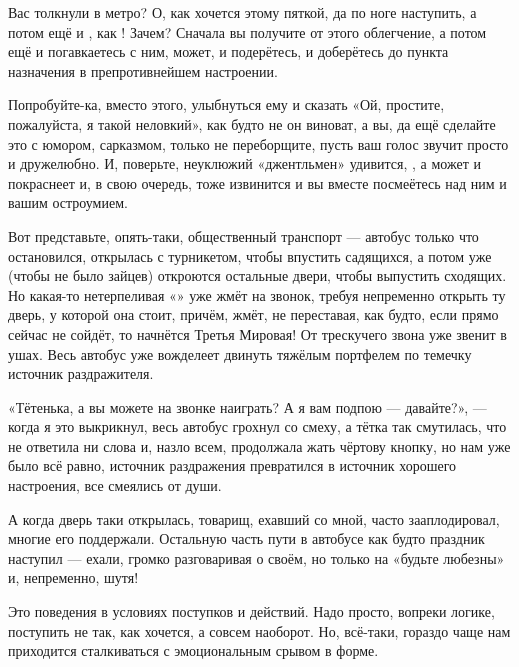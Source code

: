 Вас толкнули в метро? О, как хочется этому  пяткой, да по ноге наступить, а потом ещё и , как ! Зачем? Сначала вы получите от этого облегчение, а потом ещё и погавкаетесь с ним, может, и подерётесь, и доберётесь до пункта назначения в препротивнейшем настроении.

Попробуйте-ка, вместо этого, улыбнуться ему и сказать «Ой, простите, пожалуйста, я такой неловкий», как будто не он виноват, а вы, да ещё сделайте это с юмором,  сарказмом, только не переборщите, пусть ваш голос звучит просто и дружелюбно. И, поверьте, неуклюжий «джентльмен» удивится, , а может и покраснеет и, в свою очередь, тоже извинится и вы вместе посмеётесь над ним и вашим остроумием.

Вот представьте, опять-таки, общественный транспорт — автобус только что остановился, открылась  с турникетом, чтобы впустить садящихся, а потом уже (чтобы не было зайцев) откроются остальные двери, чтобы выпустить сходящих. Но какая-то нетерпеливая «» уже жмёт на звонок, требуя непременно открыть ту дверь, у которой она стоит, причём, жмёт, не переставая, как будто, если прямо сейчас не сойдёт, то начнётся Третья Мировая! От трескучего звона уже звенит в ушах. Весь автобус уже вожделеет двинуть тяжёлым портфелем по темечку источник раздражителя.

«Тётенька, а вы можете на звонке  наиграть? А я вам подпою --- давайте?», --- когда я это выкрикнул, весь автобус грохнул со смеху, а тётка так смутилась, что не ответила ни слова и, назло всем, продолжала жать чёртову кнопку, но нам уже было всё равно, источник раздражения превратился в источник хорошего настроения, все смеялись от души.

А когда дверь таки открылась, товарищ, ехавший со мной,  часто зааплодировал, многие его поддержали. Остальную часть пути в автобусе как будто праздник наступил --- ехали, громко разговаривая о своём, но только на «будьте любезны» и, непременно, шутя!

Это  поведения в условиях поступков и действий. Надо просто, вопреки логике, поступить не так, как хочется, а совсем наоборот. Но, всё-таки, гораздо чаще нам приходится сталкиваться с эмоциональным срывом в  форме.

